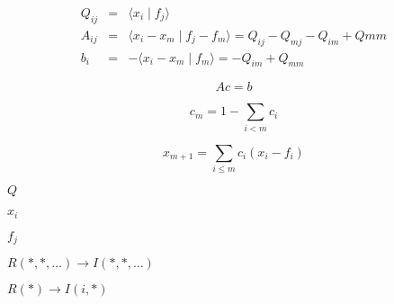 \documentclass{article}
\begin{document}
\begin{eqnarray*}
Q_{i j} & = & \langle x_i \mid f_j \rangle \\
A_{i j} & = & \langle x_i - x_m \mid f_j - f_m \rangle = Q_{i j} - Q_{m j} - Q_{i m} + Q{m m} \\
b_i & =& -\langle x_i - x_m \mid f_m \rangle = -Q_{i m} + Q_{m m}
\end{eqnarray*}
\pagebreak

\[
A c = b
\]
\pagebreak

\[
c_m = 1 - \sum_{i<m} c_i
\]
\pagebreak

\[
x_{m+1} = \sum_{i \le m}{c_i ( x_i - f_i)}
\]
\pagebreak

$ Q $
\pagebreak

$ x_i $
\pagebreak

$ f_j $
\pagebreak

$ R(*,*,\ldots) \rightarrow I(*,*,\ldots) $
\pagebreak

$ R(*) \rightarrow I(i,*) $
\pagebreak
\end{document}
